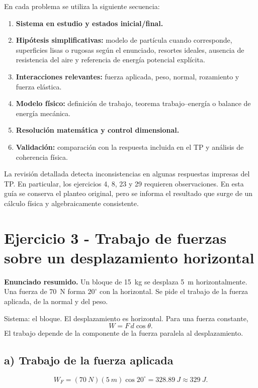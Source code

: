\documentclass[11pt,a4paper]{article}
\begin{document}
En cada problema se utiliza la siguiente secuencia:
\begin{enumerate}
\item \textbf{Sistema en estudio y estados inicial/final.}
\item \textbf{Hipótesis simplificativas:} modelo de partícula cuando corresponde, superficies lisas o rugosas según el enunciado, resortes ideales, ausencia de resistencia del aire y referencia de energía potencial explícita.
\item \textbf{Interacciones relevantes:} fuerza aplicada, peso, normal, rozamiento y fuerza elástica.
\item \textbf{Modelo físico:} definición de trabajo, teorema trabajo--energía o balance de energía mecánica.
\item \textbf{Resolución matemática y control dimensional.}
\item \textbf{Validación:} comparación con la respuesta incluida en el TP y análisis de coherencia física.
\end{enumerate}

\begin{validacion}
La revisión detallada detecta inconsistencias en algunas respuestas impresas del TP. En particular, los ejercicios 4, 8, 23 y 29 requieren observaciones. En esta guía se conserva el planteo original, pero se informa el resultado que surge de un cálculo física y algebraicamente consistente.
\end{validacion}

\section{Ejercicio 3 - Trabajo de fuerzas sobre un desplazamiento horizontal}
\textbf{Enunciado resumido.} Un bloque de \SI{15}{kg} se desplaza \SI{5}{m} horizontalmente. Una fuerza de \SI{70}{N} forma \(20^\circ\) con la horizontal. Se pide el trabajo de la fuerza aplicada, de la normal y del peso.

\begin{metodo}
Sistema: el bloque. El desplazamiento es horizontal. Para una fuerza constante,
\[
W=F\,d\cos\theta.
\]
El trabajo depende de la componente de la fuerza paralela al desplazamiento.
\end{metodo}

\subsection*{a) Trabajo de la fuerza aplicada}
\[
W_F=(\SI{70}{N})(\SI{5}{m})\cos20^\circ
=\SI{328.89}{J}\approx\SI{329}{J}.
\]
\end{document}
